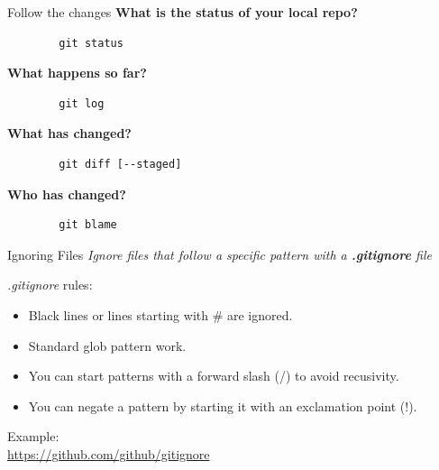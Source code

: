 \begin{frame}[fragile]{Follow the changes}
    \textbf{What is the status of your local repo?}
    \begin{lstlisting}
        git status
    \end{lstlisting}
    \textbf{What happens so far?}
    \begin{lstlisting}
        git log
    \end{lstlisting}
    \textbf{What has changed?}
    \begin{lstlisting}
        git diff [--staged]
    \end{lstlisting}
    \textbf{Who has changed?}
    \begin{lstlisting}
        git blame
    \end{lstlisting}
\end{frame}

\begin{frame}[fragile]{Ignoring Files}
    \emph{Ignore files that follow a specific pattern with a \textbf{.gitignore} file}

    \textit{.gitignore} rules:
    \begin{itemize}
        \item Black lines or lines starting with \# are ignored.
        \item Standard glob pattern work.
        \item You can start patterns with a forward slash (/) to avoid recusivity.
        \item You can negate a pattern by starting it with an exclamation point (!).
    \end{itemize}

    \vspace{1em}
    Example:\\
    \url{https://github.com/github/gitignore}

\end{frame}

